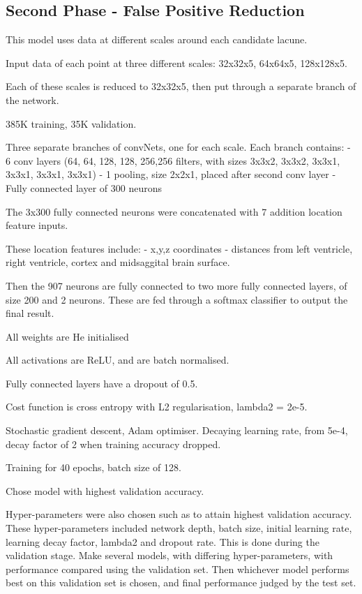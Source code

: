 \documentclass[honours,12pt]{unswthesis}
\numberwithin{equation}{section}
\begin{document}
\subsection{Second Phase - False Positive Reduction}

This model uses data at different scales around each candidate lacune. 

Input data of each point at three different scales: 32x32x5, 64x64x5, 128x128x5.

Each of these scales is reduced to 32x32x5, then put through a separate branch of the network.

385K training, 35K validation.

Three separate branches of convNets, one for each scale. Each branch contains:
 - 6 conv layers (64, 64, 128, 128, 256,256 filters, with sizes 3x3x2, 3x3x2, 3x3x1, 3x3x1, 3x3x1, 3x3x1)
 - 1 pooling, size 2x2x1, placed after second conv layer
 - Fully connected layer of 300 neurons
 
 The 3x300 fully connected neurons were concatenated with 7 addition location feature inputs.
 
 These location features include:
  - x,y,z coordinates
  - distances from left ventricle, right ventricle, cortex and midsaggital brain surface.

Then the 907 neurons are fully connected to two more fully connected layers, of size 200 and 2 neurons. 
These are fed through a softmax classifier to output the final result.

All weights are He initialised 

All activations are ReLU, and are batch normalised.

Fully connected layers have a dropout of 0.5.

Cost function is cross entropy with L2 regularisation, lambda2 = 2e-5. 

Stochastic gradient descent, Adam optimiser. Decaying learning rate, from 5e-4, decay factor of 2 when training accuracy dropped. 

Training for 40 epochs, batch size of 128.

Chose model with highest validation accuracy. 

Hyper-parameters were also chosen such as to attain highest validation accuracy. These hyper-parameters included network depth, batch size, initial learning rate, learning decay factor, lambda2 and dropout rate. This is done during the validation stage. Make several models, with differing hyper-parameters, with performance compared using the validation set. Then whichever model performs best on this validation set is chosen, and final performance judged by the test set.
\end{document}

